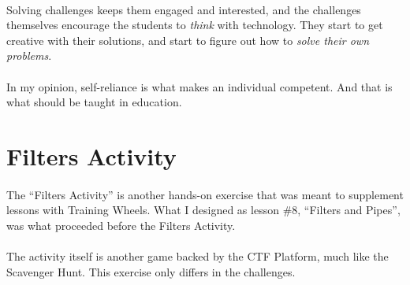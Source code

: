 \documentclass[11pt]{article}
\begin{document}
	\paragraph{} Solving challenges keeps them engaged and interested, and the challenges themselves encourage the students to \textit{think} with technology. They start to get creative with their solutions, and start to figure out how to \textit{solve their own problems}.

	\paragraph{} In my opinion, self-reliance is what makes an individual competent. And that is what should be taught in education.

	\begin{center}
		\graphicspath{ {.} }
		\centering
	\end{center}

	\newpage

	\section{Filters Activity}

	\paragraph{} The ``Filters Activity'' is another hands-on exercise that was meant to supplement lessons with Training Wheels. What I designed as lesson \#8, ``Filters and Pipes'', was what proceeded before the Filters Activity.

	\paragraph{} The activity itself is another game backed by the CTF Platform, much like the Scavenger Hunt. This exercise only differs in the challenges.
\end{document}
